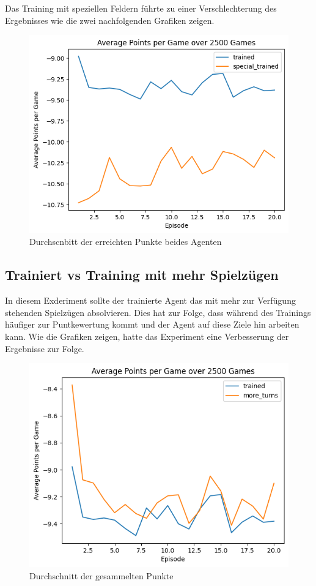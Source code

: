 Das Training mit speziellen Feldern führte zu einer Verschlechterung des Ergebnisses wie die zwei nachfolgenden Grafiken zeigen.


\begin{figure}[!t]
    \centering
    \includegraphics[scale=0.6]{Bilder/special_trained_vs_trained.png}
    \caption{Durchscnbitt der erreichten Punkte beides Agenten}
\end{figure}


\subsection{Trainiert vs Training mit mehr Spielzügen}

In diesem Exderiment sollte der trainierte Agent das mit mehr zur Verfügung stehenden Spielzügen absolvieren. Dies hat zur Folge, dass während des Trainings häufiger zur Puntkewertung kommt und der Agent auf diese Ziele hin arbeiten kann.
Wie die Grafiken zeigen, hatte das Experiment eine Verbesserung der Ergebnisse zur Folge.


\begin{figure}[!t]
    \centering
    \includegraphics[scale=0.3]{Bilder/moreTurnsVsTrained.png}
    \caption{Durchschnitt der gesammelten Punkte}
\end{figure}


